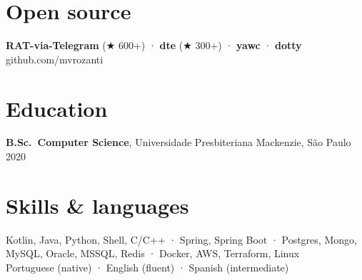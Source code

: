 \documentclass[10pt,a4paper]{article}
\begin{document}
\section{Open source}
\small\textbf{RAT-via-Telegram} (★ 600+) · \textbf{dte} (★ 300+) · \textbf{yawc} · \textbf{dotty} \hfill github.com/mvrozanti

\section{Education}
\small\textbf{B.Sc.\ Computer Science}, Universidade Presbiteriana Mackenzie, São Paulo \hfill 2020

\section{Skills \& languages}
\small
Kotlin, Java, Python, Shell, C/C++ · Spring, Spring Boot · Postgres, Mongo, MySQL, Oracle, MSSQL, Redis · Docker, AWS, Terraform, Linux\\
Portuguese (native) · English (fluent) · Spanish (intermediate)
\end{document}
